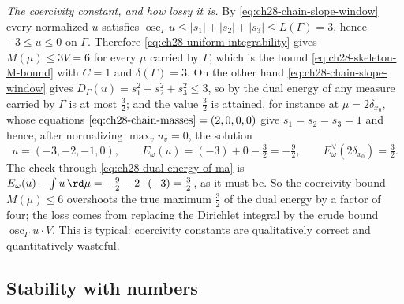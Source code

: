 \begin{example}[{The chain $\Gamma=[0,3]$: a solved equation, verified}]
\emph{The coercivity constant, and how lossy it is.}  By
\eqref{eq:ch28-chain-slope-window} every normalized $u$ satisfies
$\operatorname{osc}_\Gamma u\leq|s_1|+|s_2|+|s_3|\leq L(\Gamma)=3$, hence
$-3\leq u\leq0$ on $\Gamma$.  Therefore
\eqref{eq:ch28-uniform-integrability} gives $M(\mu)\leq3V=6$ for every
$\mu$ carried by $\Gamma$, which is the bound
\eqref{eq:ch28-skeleton-M-bound} with $C=1$ and
$\delta(\Gamma)=3$.  On the other hand
\eqref{eq:ch28-chain-slope-window} gives
$D_\Gamma(u)=s_1^2+s_2^2+s_3^2\leq3$, so by
 the dual energy of any measure carried by
$\Gamma$ is at most $\tfrac32$; and the value $\tfrac32$ is attained,
for instance at $\mu=2\delta_{x_0}$, whose equations
$\eqref{eq:ch28-chain-masses}=(2,0,0,0)$ give
$s_1=s_2=s_3=1$ and hence, after normalizing $\max_vu_v=0$, the solution
\[
 u=(-3,-2,-1,0),
 \qquad
 E_\omega(u)=(-3)+0-\tfrac32=-\tfrac92,
 \qquad
 E^\vee_\omega(2\delta_{x_0})=\tfrac32 .
\]
The check through \eqref{eq:ch28-dual-energy-of-ma} is
$E_\omega(u)-\int u\,\rd\mu=-\tfrac92-2\cdot(-3)=\tfrac32$, as it must be.
So the coercivity bound $M(\mu)\leq6$ overshoots the true maximum
$\tfrac32$ of the dual energy by a factor of four; the loss comes from
replacing the Dirichlet integral by the crude bound
$\operatorname{osc}_\Gamma u\cdot V$.  This is typical: coercivity
constants are qualitatively correct and quantitatively wasteful.
\end{example}

\subsection{Stability with numbers}
\label{sec:ch28-stability-numbers}

